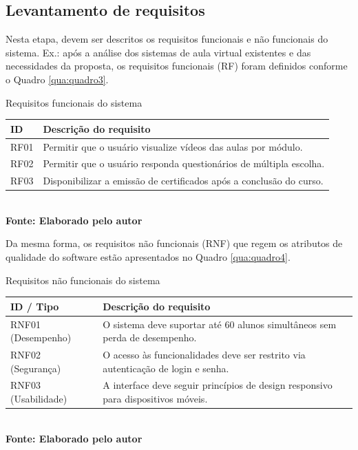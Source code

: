 \subsection{Levantamento de requisitos}
Nesta etapa, devem ser descritos os requisitos funcionais e não funcionais do sistema. Ex.: após a análise dos sistemas de aula virtual existentes e das necessidades da proposta, os requisitos funcionais (RF) foram definidos conforme o Quadro \ref{qua:quadro3}.

\begin{quadro}[H]
    \centering
    \caption{Requisitos funcionais do sistema}
    \label{qua:quadro3}
    \begin{tabular}{|C{2cm}|C{12.5cm}|}
    \hline
    \textbf{ID} & \textbf{Descrição do requisito} \\ \hline
    RF01 & Permitir que o usuário visualize vídeos das aulas por módulo. \\ \hline
    RF02 & Permitir que o usuário responda questionários de múltipla escolha. \\ \hline
    RF03 & Disponibilizar a emissão de certificados após a conclusão do curso. \\ \hline
    \end{tabular}
    \vspace{.1cm} 
    \small
    {\footnotesize\\ \textbf{Fonte: Elaborado pelo autor}}
\end{quadro}

Da mesma forma, os requisitos não funcionais (RNF) que regem os atributos de qualidade do software estão apresentados no Quadro \ref{qua:quadro4}.

\begin{quadro}[H]
    \centering
    \caption{Requisitos não funcionais do sistema}
    \label{qua:quadro4}
    \begin{tabular}{|C{2.5cm}|C{12.5cm}|}
    \hline
    \textbf{ID / Tipo} & \textbf{Descrição do requisito} \\ \hline
    RNF01 (Desempenho) & O sistema deve suportar até 60 alunos simultâneos sem perda de desempenho. \\ \hline
    RNF02 (Segurança) & O acesso às funcionalidades deve ser restrito via autenticação de login e senha. \\ \hline
    RNF03 (Usabilidade) & A interface deve seguir princípios de design responsivo para dispositivos móveis. \\ \hline
    \end{tabular}
    \vspace{.1cm} 
    \small
    {\footnotesize\\ \textbf{Fonte: Elaborado pelo autor}}
\end{quadro}

